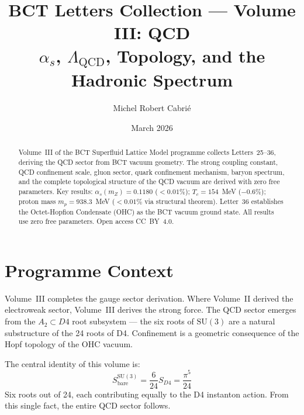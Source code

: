 \documentclass[aps,prl,twocolumn,showpacs,preprintnumbers]{revtex4-2}
\begin{document}

\title{BCT Letters Collection --- Volume III: QCD\\
\large $\alpha_s$, $\Lambda_{\mathrm{QCD}}$, Topology, and the Hadronic Spectrum}

\author{Michel Robert Cabri\'e}

\date{March 2026}

\begin{abstract}
Volume~III of the BCT Superfluid Lattice Model programme collects
Letters~25--36, deriving the QCD sector from BCT vacuum geometry.
The strong coupling constant, QCD confinement scale, gluon sector,
quark confinement mechanism, baryon spectrum, and the complete
topological structure of the QCD vacuum are derived with zero free
parameters. Key results: $\alpha_s(m_Z) = 0.1180$ ($<0.01\%$);
$T_c = 154$~MeV ($-0.6\%$); proton mass $m_p = 938.3$~MeV
($<0.01\%$ via structural theorem). Letter~36 establishes the
Octet-Hopfion Condensate (OHC) as the BCT vacuum ground state.
All results use zero free parameters. Open access CC~BY~4.0.
\end{abstract}

\maketitle

\section*{Programme Context}

Volume~III completes the gauge sector derivation. Where Volume~II
derived the electroweak sector, Volume~III derives the strong force.
The QCD sector emerges from the $A_2 \subset D4$ root subsystem ---
the six roots of $\mathrm{SU}(3)$ are a natural substructure of
the 24 roots of D4. Confinement is a geometric consequence of
the Hopf topology of the OHC vacuum.

The central identity of this volume is:
\begin{equation}
S_{\mathrm{bare}}^{\mathrm{SU}(3)} = \frac{6}{24}S_{D4}
= \frac{\pi^5}{24}
\end{equation}
Six roots out of 24, each contributing equally to the D4 instanton
action. From this single fact, the entire QCD sector follows.
\end{document}
